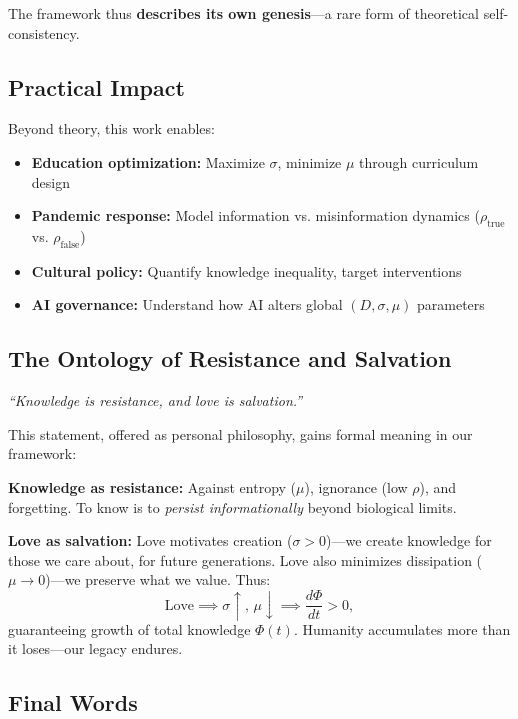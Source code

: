 \documentclass[12pt]{article}
\begin{document}
The framework thus \textbf{describes its own genesis}---a rare form of theoretical self-consistency.

\subsection{Practical Impact}

Beyond theory, this work enables:
\begin{itemize}
    \item \textbf{Education optimization:} Maximize $\sigma$, minimize $\mu$ through curriculum design
    \item \textbf{Pandemic response:} Model information vs. misinformation dynamics ($\rho_{\text{true}}$ vs. $\rho_{\text{false}}$)
    \item \textbf{Cultural policy:} Quantify knowledge inequality, target interventions
    \item \textbf{AI governance:} Understand how AI alters global $(D, \sigma, \mu)$ parameters
\end{itemize}

\subsection{The Ontology of Resistance and Salvation}

\begin{center}
\emph{``Knowledge is resistance, and love is salvation.''}
\end{center}

This statement, offered as personal philosophy, gains formal meaning in our framework:

\textbf{Knowledge as resistance:} Against entropy ($\mu$), ignorance (low $\rho$), and forgetting. To know is to \emph{persist informationally} beyond biological limits.

\textbf{Love as salvation:} Love motivates creation ($\sigma > 0$)---we create knowledge for those we care about, for future generations. Love also minimizes dissipation ($\mu \to 0$)---we preserve what we value. Thus:
\begin{equation}
    \text{Love} \implies \sigma \uparrow,\, \mu \downarrow \implies \frac{d\Phi}{dt} > 0,
\end{equation}
guaranteeing growth of total knowledge $\Phi(t)$. Humanity accumulates more than it loses---our legacy endures.

\subsection{Final Words}
\end{document}

